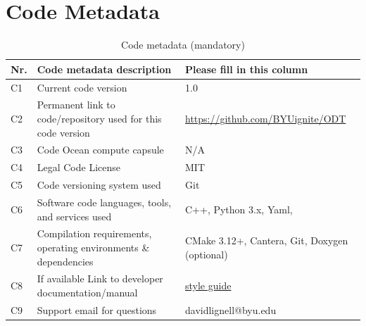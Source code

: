 \documentclass[preprint,12pt, a4paper]{elsarticle}
\begin{document}
\section*{Code Metadata}
\label{metadata}

\begin{table}[H]
\begin{tabular}{|l|p{6.5cm}|p{6.5cm}|}
\hline
\textbf{Nr.} & \textbf{Code metadata description} & \textbf{Please fill in this column} \\
\hline
C1 & Current code version & 1.0 \\
\hline
C2 & Permanent link to code/repository used for this code version & \href{https://github.com/BYUignite/ODT}{https://github.com/BYUignite/ODT} \\
\hline
C3 & Code Ocean compute capsule & N/A\\
\hline
C4 & Legal Code License   & MIT \\
\hline
C5 & Code versioning system used & Git \\
\hline
C6 & Software code languages, tools, and services used & C++, Python 3.x, Yaml,  \\
\hline
C7 & Compilation requirements, operating environments \& dependencies & CMake 3.12+, Cantera, Git, Doxygen (optional) \\
\hline
C8 & If available Link to developer documentation/manual & \href{https://byuignite.github.io/ODT/doxygen/html/style_guide.html}{style guide} \\
\hline
C9 & Support email for questions & davidlignell@byu.edu \\
\hline
\end{tabular}
\caption{Code metadata (mandatory)}
\end{table}


\linenumbers


\end{document}
